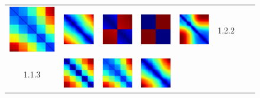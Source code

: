 \documentclass[bachelor, nocolorlinks, printoneside]{seuthesis} %
\begin{document}
\begin{Main}
\begin{figure}[ht!]
\begin{centering}
\begin{tabular}{cccc|cccc}
        \includegraphics[width=0.12\columnwidth,keepaspectratio]{figs/toyset_matrices/cluster_5by20_2_2.png} &
        \includegraphics[width=0.12\columnwidth,keepaspectratio]{figs/toyset_matrices/cluster_5by20_2_3.png} &  
        \includegraphics[width=0.12\columnwidth,keepaspectratio]{figs/toyset_matrices/cluster_2by10_2_1.png} &
        \includegraphics[width=0.12\columnwidth,keepaspectratio]{figs/toyset_matrices/cluster_2by10_2_2.png} &
        \includegraphics[width=0.12\columnwidth,keepaspectratio]{figs/toyset_matrices/cluster_2by10_2_3.png}& 1.2.2\\
        1.1.3 &\includegraphics[width=0.12\columnwidth,keepaspectratio]{figs/toyset_matrices/cluster_5by20_3_1.png} &
        \includegraphics[width=0.12\columnwidth,keepaspectratio]{figs/toyset_matrices/cluster_5by20_3_2.png} &
        \includegraphics[width=0.12\columnwidth,keepaspectratio]{figs/toyset_matrices/cluster_5by20_3_3.png} &  

\end{tabular}
\end{centering}
\end{figure}
\end{Main}
\end{document}
